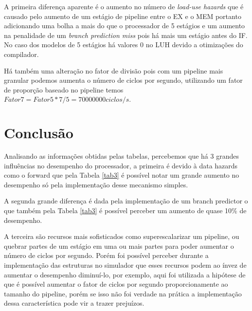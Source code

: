 \documentclass[pdftex,12pt,a4paper]{article}
\begin{document}
A primeira diferença aparente é o aumento no número de \textit{load-use hazards} 
que é causado pelo aumento de um estágio de pipeline entre o EX e o MEM portanto 
adicionando uma bolha a mais do que o processador de 5 estágios e um aumento na 
penalidade de um \textit{branch prediction miss} pois há mais um estágio antes do
IF. No caso dos modelos de 5 estágios há valores 0 no LUH devido a otimizações do 
compilador.

Há também uma alteração no fator de divisão pois com um pipeline mais granular 
podemos aumenta o número de ciclos por segundo, utilizando um fator de proporção 
baseado no pipeline temos $Fator7 = Fator5*7/5 = 70000000 ciclos/s$.

\section{Conclusão}

Analisando as informações obtidas pelas tabelas, percebemos que há 3 grandes 
influências no desempenho do processador, a primeira é devido à data hazards 
como o forward que pela Tabela \ref{tab3} é possível notar um grande aumento no 
desempenho só pela implementação desse mecanismo simples.

A segunda grande diferença é dada pela implementação de um branch predictor 
o que também pela Tabela \ref{tab3} é possível perceber um aumento de 
quase 10\% de desempenho.

A terceira são recursos mais sofisticados como superescalarizar um pipeline, 
ou quebrar partes de um estágio em uma ou mais partes para poder aumentar 
o número de ciclos por segundo. Porém foi possível perceber durante a 
implementação das estruturas no simulador que esses recursos podem ao ínvez
de aumentar o desempenho diminuí-lo, por exemplo, aqui foi utilizada a 
hipótese de que é possível aumentar o fator de ciclos por segundo proporcionamente 
ao tamanho do pipeline, porém se isso não foi verdade na prática a 
implementação dessa característica pode vir a trazer prejuízos.
\end{document}
